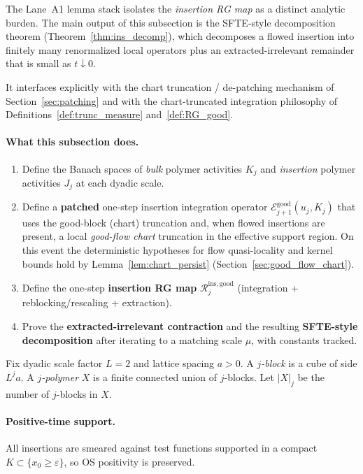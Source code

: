 The Lane~A1 lemma stack isolates the \emph{insertion RG map} as a distinct analytic burden.
The main output of this subsection is the SFTE-style decomposition theorem (Theorem~\ref{thm:ins_decomp}), which decomposes a flowed insertion into finitely many renormalized local operators plus an extracted-irrelevant remainder that is small as $t\downarrow 0$.

It interfaces explicitly with the chart truncation / de-patching mechanism of Section~\ref{sec:patching} and with the chart-truncated integration philosophy of Definitions~\ref{def:trunc_measure} and~\ref{def:RG_good}.

\paragraph{What this subsection does.}

\begin{enumerate}[label=(\roman*)]
\item Define the Banach spaces of \emph{bulk} polymer activities $K_j$ and \emph{insertion} polymer activities $J_j$ at each dyadic scale.
\item Define a \textbf{patched} one-step insertion integration operator $\mathcal E^{\mathrm{good}}_{j+1}(u_j,K_j)$ that uses the good-block (chart) truncation and,
when flowed insertions are present, a local \emph{good-flow chart} truncation in the effective support region. On this event the deterministic hypotheses
for flow quasi-locality and kernel bounds hold by Lemma~\ref{lem:chart_persist} (Section~\ref{sec:good_flow_chart}).
\item Define the one-step \textbf{insertion RG map} $\mathcal R^{\mathrm{ins,good}}_j$ (integration + reblocking/rescaling + extraction).
\item Prove the \textbf{extracted-irrelevant contraction} and the resulting \textbf{SFTE-style decomposition} after iterating to a matching scale $\mu$,
with constants tracked.
\end{enumerate}

Fix dyadic scale factor $L=2$ and lattice spacing $a>0$. A \emph{$j$-block} is a cube of side $L^j a$.
A \emph{$j$-polymer} $X$ is a finite connected union of $j$-blocks. Let $|X|_j$ be the number of $j$-blocks in $X$.

\paragraph{Positive-time support.}
All insertions are smeared against test functions supported in a compact $K\subset\{x_0\ge \varepsilon\}$, so OS positivity is preserved.

